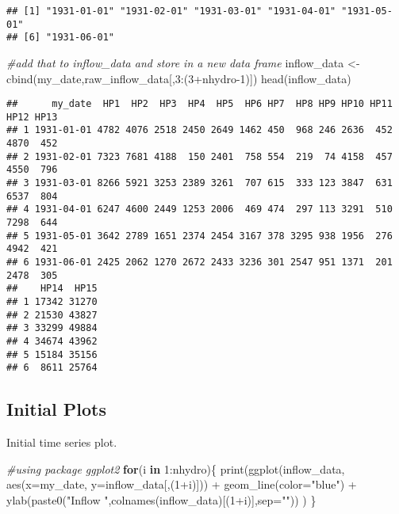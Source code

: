 \documentclass[
]{article}
\newenvironment{Shaded}{\begin{snugshade}}{\end{snugshade}}
\newcommand{\AttributeTok}[1]{\textcolor[rgb]{0.77,0.63,0.00}{#1}}
\newcommand{\CommentTok}[1]{\textcolor[rgb]{0.56,0.35,0.01}{\textit{#1}}}
\newcommand{\ControlFlowTok}[1]{\textcolor[rgb]{0.13,0.29,0.53}{\textbf{#1}}}
\newcommand{\DecValTok}[1]{\textcolor[rgb]{0.00,0.00,0.81}{#1}}
\newcommand{\FunctionTok}[1]{\textcolor[rgb]{0.00,0.00,0.00}{#1}}
\newcommand{\NormalTok}[1]{#1}
\newcommand{\OtherTok}[1]{\textcolor[rgb]{0.56,0.35,0.01}{#1}}
\newcommand{\SpecialCharTok}[1]{\textcolor[rgb]{0.00,0.00,0.00}{#1}}
\newcommand{\StringTok}[1]{\textcolor[rgb]{0.31,0.60,0.02}{#1}}
\begin{document}
\begin{verbatim}
## [1] "1931-01-01" "1931-02-01" "1931-03-01" "1931-04-01" "1931-05-01"
## [6] "1931-06-01"
\end{verbatim}

\begin{Shaded}
\begin{Highlighting}[]
\CommentTok{\#add that to inflow\_data and store in a new data frame }
\NormalTok{inflow\_data }\OtherTok{\textless{}{-}} \FunctionTok{cbind}\NormalTok{(my\_date,raw\_inflow\_data[,}\DecValTok{3}\SpecialCharTok{:}\NormalTok{(}\DecValTok{3}\SpecialCharTok{+}\NormalTok{nhydro}\DecValTok{{-}1}\NormalTok{)])}
\FunctionTok{head}\NormalTok{(inflow\_data)}
\end{Highlighting}
\end{Shaded}

\begin{verbatim}
##      my_date  HP1  HP2  HP3  HP4  HP5  HP6 HP7  HP8 HP9 HP10 HP11 HP12 HP13
## 1 1931-01-01 4782 4076 2518 2450 2649 1462 450  968 246 2636  452 4870  452
## 2 1931-02-01 7323 7681 4188  150 2401  758 554  219  74 4158  457 4550  796
## 3 1931-03-01 8266 5921 3253 2389 3261  707 615  333 123 3847  631 6537  804
## 4 1931-04-01 6247 4600 2449 1253 2006  469 474  297 113 3291  510 7298  644
## 5 1931-05-01 3642 2789 1651 2374 2454 3167 378 3295 938 1956  276 4942  421
## 6 1931-06-01 2425 2062 1270 2672 2433 3236 301 2547 951 1371  201 2478  305
##    HP14  HP15
## 1 17342 31270
## 2 21530 43827
## 3 33299 49884
## 4 34674 43962
## 5 15184 35156
## 6  8611 25764
\end{verbatim}

\hypertarget{initial-plots}{%
\subsection{Initial Plots}\label{initial-plots}}

Initial time series plot.

\begin{Shaded}
\begin{Highlighting}[]
\CommentTok{\#using package ggplot2}
\ControlFlowTok{for}\NormalTok{(i }\ControlFlowTok{in} \DecValTok{1}\SpecialCharTok{:}\NormalTok{nhydro)\{}
  \FunctionTok{print}\NormalTok{(}\FunctionTok{ggplot}\NormalTok{(inflow\_data, }\FunctionTok{aes}\NormalTok{(}\AttributeTok{x=}\NormalTok{my\_date, }\AttributeTok{y=}\NormalTok{inflow\_data[,(}\DecValTok{1}\SpecialCharTok{+}\NormalTok{i)])) }\SpecialCharTok{+}
            \FunctionTok{geom\_line}\NormalTok{(}\AttributeTok{color=}\StringTok{"blue"}\NormalTok{) }\SpecialCharTok{+}
            \FunctionTok{ylab}\NormalTok{(}\FunctionTok{paste0}\NormalTok{(}\StringTok{"Inflow "}\NormalTok{,}\FunctionTok{colnames}\NormalTok{(inflow\_data)[(}\DecValTok{1}\SpecialCharTok{+}\NormalTok{i)],}\AttributeTok{sep=}\StringTok{""}\NormalTok{)) }
\NormalTok{        )}
\NormalTok{\}}
\end{Highlighting}
\end{Shaded}
\end{document}
